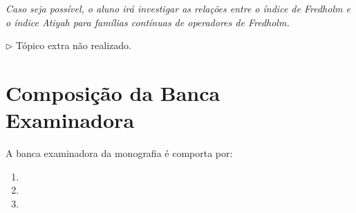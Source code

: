\documentclass[11pt,a4paper]{amsart}
\newcommand{\assinaturas}{
  \setlength{\tabcolsep}{2em}
  \vspace*{.05\textheight}
  \begin{center}
    \begin{tabular}{cc}
      \underline{\hspace*{7cm}}&\underline{\hspace*{7cm}}\\[.5em]
      \usebox{\alunobox}&\usebox{\orientbox}\\
      Aluno&Orientador                        
    \end{tabular}
  \end{center}
}
\begin{document}
\begin{itroman}
  \item \textit{Caso seja possível, o aluno irá investigar as relações entre o índice de Fredholm e o índice Atiyah para famílias contínuas de operadores de Fredholm.}
  \item[] $\triangleright$ Tópico extra não realizado.
\end{itroman}



\section{Composição da Banca Examinadora}

A banca examinadora da monografia é comporta por:

\bigskip
\begin{enumerate}[1.]
  \item \usebox{\orientbox}
  \item \usebox{\bancapribox}
  \item \usebox{\bancasegbox}
\end{enumerate}
\nocite{brown1977morita,exel7fredholm,kasparov1980stinespring,raeburn1998morita,rieffel1981c,RIEFFEL1974176}




\end{document}
